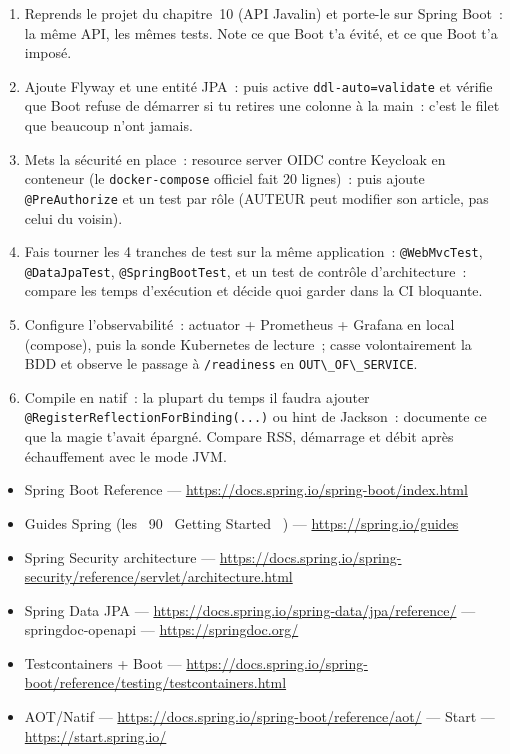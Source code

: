 \begin{exercice}
\begin{enumerate}
  \item Reprends le projet du chapitre~10 (API Javalin) et porte-le sur Spring Boot~: la m\^eme API,
        les m\^emes tests. Note ce que Boot t'a \'evit\'e, et ce que Boot t'a impos\'e.
  \item Ajoute Flyway et une entit\'e JPA~: puis active \verb|ddl-auto=validate| et v\'erifie que Boot
        refuse de d\'emarrer si tu retires une colonne \`a la main~: c'est le filet que beaucoup n'ont jamais.
  \item Mets la s\'ecurit\'e en place~: resource server OIDC contre Keycloak en conteneur (le
        \verb|docker-compose| officiel fait 20 lignes)~: puis ajoute \verb|@PreAuthorize| et un test
        par r\^ole (AUTEUR peut modifier son article, pas celui du voisin).
  \item Fais tourner les 4 tranches de test sur la m\^eme application~: \verb|@WebMvcTest|,
        \verb|@DataJpaTest|, \verb|@SpringBootTest|, et un test de contr\^ole d'architecture~: compare
        les temps d'ex\'ecution et d\'ecide quoi garder dans la CI bloquante.
  \item Configure l'observabilit\'e~: actuator + Prometheus + Grafana en local (compose), puis la
        sonde Kubernetes de lecture~; casse volontairement la BDD et observe le passage \`a
        \verb|/readiness| en \verb|OUT\_OF\_SERVICE|.
  \item Compile en natif~: la plupart du temps il faudra ajouter
        \verb|@RegisterReflectionForBinding(...)| ou hint de Jackson~: documente ce que la magie
        t'avait \'epargn\'e. Compare RSS, d\'emarrage et d\'ebit apr\`es \'echauffement avec le mode JVM.
\end{enumerate}
\end{exercice}

\begin{ressources}
\begin{itemize}
  \item Spring Boot Reference --- \url{https://docs.spring.io/spring-boot/index.html}
  \item Guides Spring (les ~90 \og ~Getting Started~ \fg{}) --- \url{https://spring.io/guides}
  \item Spring Security architecture --- \url{https://docs.spring.io/spring-security/reference/servlet/architecture.html}
  \item Spring Data JPA --- \url{https://docs.spring.io/spring-data/jpa/reference/} --- springdoc-openapi --- \url{https://springdoc.org/}
  \item Testcontainers + Boot --- \url{https://docs.spring.io/spring-boot/reference/testing/testcontainers.html}
  \item AOT/Natif --- \url{https://docs.spring.io/spring-boot/reference/aot/} --- Start --- \url{https://start.spring.io/}
\end{itemize}
\end{ressources}


